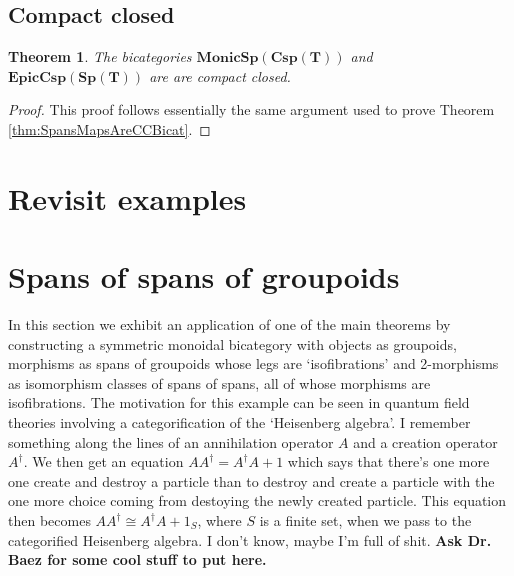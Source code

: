 \documentclass[11pt]{amsart}
\newcommand{\bimonspcsp}[1]{\mathbf{MonicSp(Csp(#1))}}
\newcommand{\biepiccspsp}[1]{\mathbf{EpicCsp(Sp(#1))}}
\newtheorem{thm}{Theorem}[section]
\theoremstyle{remark}
\theoremstyle{definition}
\begin{document}
\subsection{Compact closed} %
\label{subsec.SpansCospansAreCCBicats}

\begin{thm}
	\label{thm:SpansCospansAreCCBicat}
	The bicategories $\bimonspcsp{T}$ and $\biepiccspsp{T}$ are are compact closed.
\end{thm}

\begin{proof}
	This proof follows essentially the same argument used to prove Theorem \ref{thm:SpansMapsAreCCBicat}.
\end{proof}

\section{Revisit examples} %
\label{sec:RevisitExs}

\section{Spans of spans of groupoids}
In this section we exhibit an application of one of the main theorems by constructing a symmetric monoidal bicategory with objects as groupoids, morphisms as spans of groupoids whose legs are `isofibrations' and 2-morphisms as isomorphism classes of spans of spans, all of whose morphisms are isofibrations. The motivation for this example can be seen in quantum field theories involving a categorification of the `Heisenberg algebra'. I remember something along the lines of an annihilation operator $A$ and a creation operator $A^\dagger$. We then get an equation $AA^\dagger = A^\dagger A+1$ which says that there's one more one create and destroy a particle than to destroy and create a particle with the one more choice coming from destoying the newly created particle. This equation then becomes $AA^\dagger \cong A^\dagger A + 1_{S}$, where $S$ is a finite set, when we pass to the categorified Heisenberg algebra. I don't know, maybe I'm full of shit. \textbf{Ask Dr. Baez for some cool stuff to put here.} 
\end{document}
